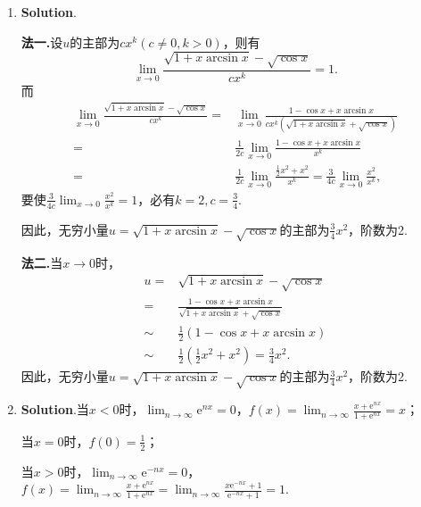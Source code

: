 \documentclass[../main.tex]{subfiles}
\begin{document}
\begin{enumerate}
    \item \textbf{Solution}.

          \textbf{法一.}设$u$的主部为$cx^{k}(c\neq0,k>0)$，则有
          \[
              \lim_{x\to0}\frac{\sqrt{1+x\arcsin x}-\sqrt{\cos x}}{cx^{k}}=1.
          \]
          而
          \[
              \begin{aligned}
                  \lim_{x\to0}\frac{\sqrt{1+x\arcsin x}-\sqrt{\cos x}}{cx^k}= {} & \lim_{x\to0}\frac{1-\cos x+x\arcsin x}{cx^k(\sqrt{1+x\arcsin x}+\sqrt{\cos x})}                   \\
                  = {}                                                           & \frac{1}{2c}\lim_{x\to0}\frac{1-\cos x+x\arcsin x}{x^k}                                           \\
                  = {}                                                           & \frac{1}{2c}\lim_{x\to0}\frac{\frac{1}{2}x^2+x^2}{x^k}=\frac{3}{4c}\lim_{x\to0}{\frac{x^2}{x^k}},
              \end{aligned}
          \]
          要使$\frac{3}{4c}\lim_{x\to0}{\frac{x^{2}}{x^{k}}}=1$，必有$k=2,c=\frac{3}{4}$.

          因此，无穷小量$u=\sqrt{1+x\arcsin x}-\sqrt{\cos x}$的主部为$\frac{3}{4}
              x^{2}$，阶数为2.

          \textbf{法二.}当$x\to0$时，
          \[
              \begin{aligned}
                  u={}     & \sqrt{1+x\arcsin x}-\sqrt{\cos x}                                \\
                  = {}     & \frac{1-\cos x+x\arcsin x}{\sqrt{1+x\arcsin x}+\sqrt{\cos x}}    \\
                  \sim  {} & \frac{1}{2}(1-\cos x+x\arcsin x)                                 \\
                  \sim  {} & \frac{1}{2}\left(\frac{1}{2}x^{2}+x^{2}\right)=\frac{3}{4}x^{2}.
              \end{aligned}
          \]
          因此，无穷小量$u=\sqrt{1+x\arcsin x}-\sqrt{\cos x}$的主部为$\frac{3}{4}
              x^{2}$，阶数为2.

    \item \textbf{Solution}.当$x<0$时，$\lim_{n\to\infty}\mathrm{e}^{nx}=0$，$f(x
              )=\lim_{n\to\infty}\frac{x+\mathrm{e}^{nx}}{1+\mathrm{e}^{nx}}=x$；

          当$x=0$时，$f(0)=\frac{1}{2}$；

          当$x>0$时，$\lim_{n\to\infty}\mathrm{e}^{-nx}=0$，$f(x)=\lim_{n\to\infty}\frac{x+\mathrm{e}^{nx}}{1+\mathrm{e}^{nx}}
              =\lim_{n\to\infty}\frac{x\mathrm{e}^{-nx}+1}{\mathrm{e}^{-nx}+1}=1.$


\end{enumerate}
\end{document}
